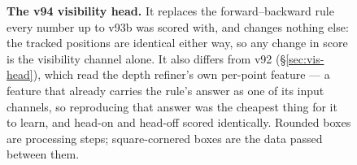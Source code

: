 \begin{figure}[!tbp]
\begin{tikzpicture}
\end{tikzpicture}
\caption{\textbf{The v94 visibility head.} It replaces the forward--backward rule every number up
  to v93b was scored with, and changes nothing else: the tracked positions are identical either
  way, so any change in score is the visibility channel alone. It also differs from v92
  (\S\ref{sec:vis-head}), which read the depth refiner's own per-point feature --- a feature that
  already carries the rule's answer as one of its input channels, so reproducing that answer was
  the cheapest thing for it to learn, and head-on and head-off scored identically.
  Rounded boxes are processing steps; square-cornered boxes are the data passed between them.}
\label{fig:v94-head}
\end{figure}
